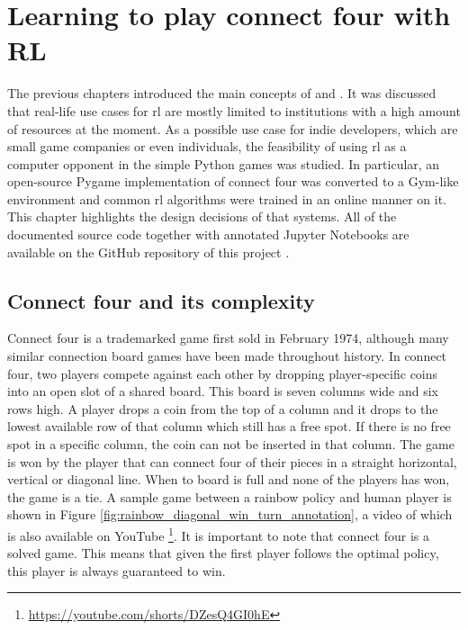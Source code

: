\chapter{Learning to play connect four with RL}
\label{ch:connect_four_rl}

The previous chapters introduced the main concepts of  and .
It was discussed that real-life use cases for \gls{rl} are mostly limited to institutions with a high amount of resources at the moment.
As a possible use case for indie developers, which are small game companies or even individuals, the feasibility of using \gls{rl} as a computer opponent in the simple Python games was studied.
In particular, an open-source Pygame implementation of connect four was converted to a Gym-like environment and common \gls{rl} algorithms were trained in an online manner on it.
This chapter highlights the design decisions of that systems.
All of the documented source code together with annotated Jupyter Notebooks are available on the GitHub repository of this project \citep{github_project}.


\section{Connect four and its complexity}
\label{sec:connect_four_rl-harder_then_you_think}

Connect four is a trademarked game first sold in February 1974, although many similar connection board games have been made throughout history.
In connect four, two players compete against each other by dropping player-specific coins into an open slot of a shared board.
This board is seven columns wide and six rows high.
A player drops a coin from the top of a column and it drops to the lowest available row of that column which still has a free spot.
If there is no free spot in a specific column, the coin can not be inserted in that column.
The game is won by the player that can connect four of their pieces in a straight horizontal, vertical or diagonal line.
When to board is full and none of the players has won, the game is a tie. 
A sample game between a rainbow policy and human player is shown in Figure \ref{fig:rainbow_diagonal_win_turn_annotation}, a video of which is also available on YouTube \footnote{\url{https://youtube.com/shorts/DZesQ4GI0hE}}.
It is important to note that connect four is a solved game.
This means that given the first player follows the optimal policy, this player is always guaranteed to win.

